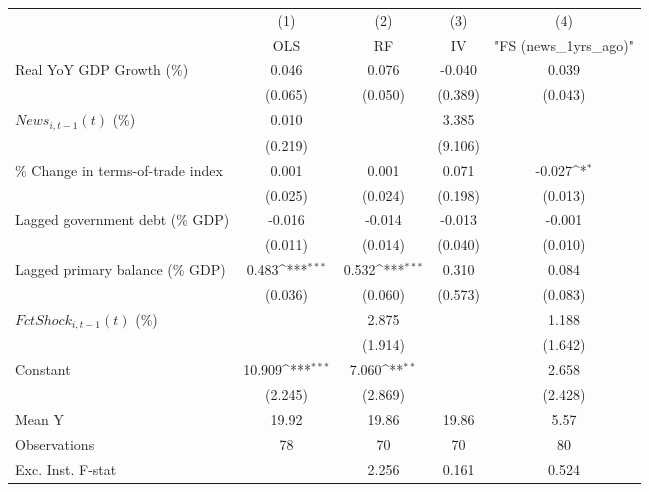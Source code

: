 {
\def\sym#1{\ifmmode^{#1}\else\(^{#1}\)\fi}
\begin{tabular}{l*{4}{c}}
\toprule
                    &\multicolumn{1}{c}{(1)}&\multicolumn{1}{c}{(2)}&\multicolumn{1}{c}{(3)}&\multicolumn{1}{c}{(4)}\\
                    &\multicolumn{1}{c}{OLS}&\multicolumn{1}{c}{RF}&\multicolumn{1}{c}{IV}&\multicolumn{1}{c}{ "FS (news_1yrs_ago)" }\\
\midrule
Real YoY GDP Growth (\%)&       0.046         &       0.076         &      -0.040         &       0.039         \\
                    &     (0.065)         &     (0.050)         &     (0.389)         &     (0.043)         \\
\addlinespace
$ News_{i,t-1}(t)$ (\%)&       0.010         &                     &       3.385         &                     \\
                    &     (0.219)         &                     &     (9.106)         &                     \\
\addlinespace
\% Change in terms-of-trade index&       0.001         &       0.001         &       0.071         &      -0.027\sym{*}  \\
                    &     (0.025)         &     (0.024)         &     (0.198)         &     (0.013)         \\
\addlinespace
Lagged government debt (\% GDP)&      -0.016         &      -0.014         &      -0.013         &      -0.001         \\
                    &     (0.011)         &     (0.014)         &     (0.040)         &     (0.010)         \\
\addlinespace
Lagged primary balance (\% GDP)&       0.483\sym{***}&       0.532\sym{***}&       0.310         &       0.084         \\
                    &     (0.036)         &     (0.060)         &     (0.573)         &     (0.083)         \\
\addlinespace
$ FctShock_{i,t-1}(t)$ (\%)&                     &       2.875         &                     &       1.188         \\
                    &                     &     (1.914)         &                     &     (1.642)         \\
\addlinespace
Constant            &      10.909\sym{***}&       7.060\sym{**} &                     &       2.658         \\
                    &     (2.245)         &     (2.869)         &                     &     (2.428)         \\
\midrule
Mean Y              &       19.92         &       19.86         &       19.86         &        5.57         \\
Observations        &          78         &          70         &          70         &          80         \\
Exc. Inst. F-stat   &                     &       2.256         &       0.161         &       0.524         \\
\bottomrule
\end{tabular}
}
